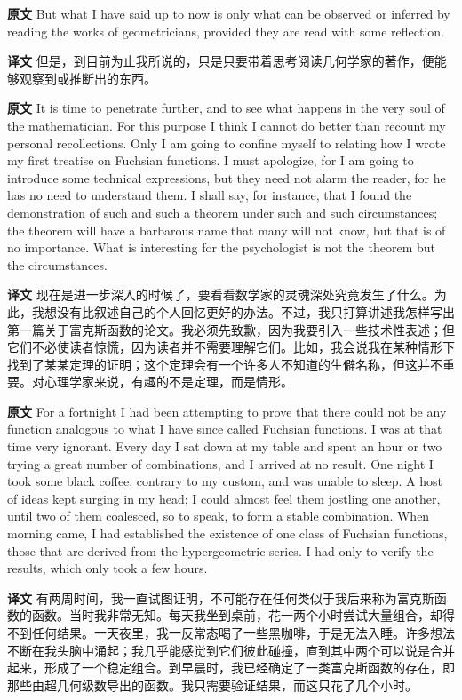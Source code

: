 \documentclass[UTF8]{ctexart}
\newenvironment{english}{\par\small\noindent\textbf{原文}\quad\ignorespaces}{\par}
\newenvironment{zhtranslation}{\par\noindent\textbf{译文}\quad\ignorespaces}{\par\vspace{0.35em}}
\begin{document}
\begin{english}
But what I have said up to now is only what can be observed or inferred by reading the works of geometricians, provided they are read with some reflection.
\end{english}
\begin{zhtranslation}
但是，到目前为止我所说的，只是只要带着思考阅读几何学家的著作，便能够观察到或推断出的东西。\end{zhtranslation}

\begin{english}
It is time to penetrate further, and to see what happens in the very soul of the mathematician. For this purpose I think I cannot do better than recount my personal recollections. Only I am going to confine myself to relating how I wrote my first treatise on Fuchsian functions. I must apologize, for I am going to introduce some technical expressions, but they need not alarm the reader, for he has no need to understand them. I shall say, for instance, that I found the demonstration of such and such a theorem under such and such circumstances; the theorem will have a barbarous name that many will not know, but that is of no importance. What is interesting for the psychologist is not the theorem but the circumstances.
\end{english}
\begin{zhtranslation}
现在是进一步深入的时候了，要看看数学家的灵魂深处究竟发生了什么。为此，我想没有比叙述自己的个人回忆更好的办法。不过，我只打算讲述我怎样写出第一篇关于富克斯函数的论文。我必须先致歉，因为我要引入一些技术性表述；但它们不必使读者惊慌，因为读者并不需要理解它们。比如，我会说我在某种情形下找到了某某定理的证明；这个定理会有一个许多人不知道的生僻名称，但这并不重要。对心理学家来说，有趣的不是定理，而是情形。\end{zhtranslation}

\begin{english}
For a fortnight I had been attempting to prove that there could not be any function analogous to what I have since called Fuchsian functions. I was at that time very ignorant. Every day I sat down at my table and spent an hour or two trying a great number of combinations, and I arrived at no result. One night I took some black coffee, contrary to my custom, and was unable to sleep. A host of ideas kept surging in my head; I could almost feel them jostling one another, until two of them coalesced, so to speak, to form a stable combination. When morning came, I had established the existence of one class of Fuchsian functions, those that are derived from the hypergeometric series. I had only to verify the results, which only took a few hours.
\end{english}
\begin{zhtranslation}
有两周时间，我一直试图证明，不可能存在任何类似于我后来称为富克斯函数的函数。当时我非常无知。每天我坐到桌前，花一两个小时尝试大量组合，却得不到任何结果。一天夜里，我一反常态喝了一些黑咖啡，于是无法入睡。许多想法不断在我头脑中涌起；我几乎能感觉到它们彼此碰撞，直到其中两个可以说是合并起来，形成了一个稳定组合。到早晨时，我已经确定了一类富克斯函数的存在，即那些由超几何级数导出的函数。我只需要验证结果，而这只花了几个小时。\end{zhtranslation}
\end{document}
